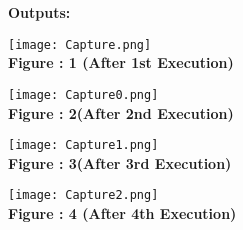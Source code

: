 \documentclass[11pt]{article}            %
\begin{document}
\textbf{Outputs: }\\ 

\begin{center}
 \texttt{[image: Capture.png]}\\ 
\textbf{Figure : 1 (After 1st Execution)}
\vskip 0.5cm
\end{center}

\begin{center}
 \texttt{[image: Capture0.png]}\\ 
\textbf{Figure : 2(After 2nd Execution)}
\vskip 0.5cm
\end{center}

\begin{center}
 \texttt{[image: Capture1.png]}\\ 
\textbf{Figure : 3(After 3rd Execution)}
\vskip 0.5cm
\end{center}

\begin{center}
 \texttt{[image: Capture2.png]}\\ 
\textbf{Figure : 4 (After 4th Execution)}
\vskip 0.5cm
\end{center}



 
\end{document}
